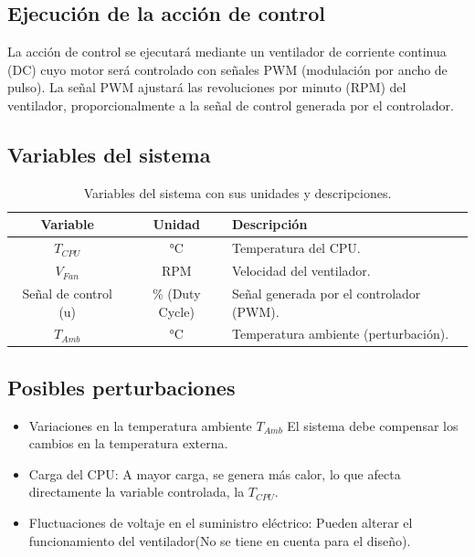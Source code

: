\documentclass[12pt]{article}
\begin{document}
	
	
	\subsection{Ejecución de la acción de control}
	La acción de control se ejecutará mediante un ventilador de corriente continua (DC) cuyo motor será controlado con señales PWM (modulación por ancho de pulso). La señal PWM ajustará las revoluciones por minuto (RPM) del ventilador, proporcionalmente a la señal de control generada por el controlador.
	\newpage
	
	\subsection{Variables del sistema}
	\begin{table}[h!]
		\centering
		\begin{tabular}{|c|c|l|}
			\hline
			\textbf{Variable} & \textbf{Unidad} & \textbf{Descripción} \\ \hline
			$T_{CPU}$ & °C & Temperatura del CPU. \\ \hline
			$V_{Fan}$ & RPM & Velocidad del ventilador. \\ \hline
			Señal de control (u) & \% (Duty Cycle) & Señal generada por el controlador (PWM). \\ \hline
			$T_{Amb}$ & °C & Temperatura ambiente (perturbación). \\ \hline
		\end{tabular}
		\caption{Variables del sistema con sus unidades y descripciones.}
		\label{tab:variables}
	\end{table}
	
	
	\subsection{Posibles perturbaciones}
	\begin{itemize}
		\item Variaciones en la temperatura ambiente $T_{Amb}$ El sistema debe compensar los cambios en la temperatura externa.
		\item Carga del CPU: A mayor carga, se genera más calor, lo que afecta directamente la variable controlada, la $T_{CPU}$.
		\item Fluctuaciones de voltaje en el suministro eléctrico: Pueden alterar el funcionamiento del ventilador(No se tiene en cuenta para el diseño).
	\end{itemize}
	
\end{document}
